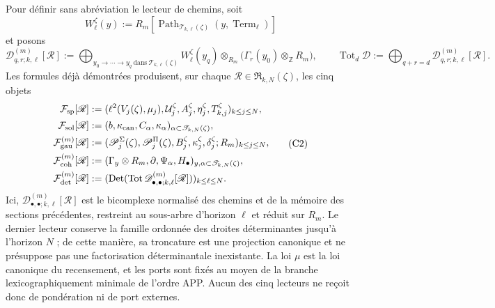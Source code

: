 Pour définir sans abréviation le lecteur de chemins, soit
\[
 W_\ell^\zeta(y):=
 R_m[\operatorname{Path}_{\mathscr T_{k,\ell}(\zeta)}
          (y,\operatorname{Term}_\ell)]
\]
et posons
\[
 \mathscr D_{q,r;k,\ell}^{(m)}[\mathscr R]
 :=\bigoplus_{y_0\to\cdots\to y_q\ \text{dans}\
                  \mathscr T_{k,\ell}(\zeta)}
 W_\ell^\zeta(y_q)\otimes_{R_m}
 \bigl(\Gamma_r(y_0)\otimes_{\mathbb Z}R_m\bigr),
 \qquad
 \operatorname{Tot}_d\mathscr D
 :=\bigoplus_{q+r=d}\mathscr D_{q,r;k,\ell}^{(m)}[\mathscr R].
\]
Les formules déjà démontrées produisent, sur chaque
\(\mathscr R\in\mathfrak R_{k,N}(\zeta)\), les cinq objets
\[
\begin{aligned}
 \mathcal F_{\rm sp}[\mathscr R]
 &:=(\ell^2(V_j(\zeta),\mu_j),
       \mathcal U_j^\zeta,A_j^\zeta,\eta_j^\zeta,
       T_{k,j}^\zeta)_{k\leq j\leq N},\\
 \mathcal F_{\rm sol}[\mathscr R]
 &:=(b,\kappa_{\rm can},C_\alpha,\kappa_\alpha)
      _{\alpha\subset\mathscr T_{k,N}(\zeta)},\\
 \mathcal F_{\rm gau}^{(m)}[\mathscr R]
 &:=(\mathscr P_j^\Sigma(\zeta),\mathscr P_j^\Pi(\zeta),
       B_j^\zeta,\kappa_j^\zeta,\delta_j^\zeta;R_m)_{k\leq j\leq N},\\
 \mathcal F_{\rm coh}^{(m)}[\mathscr R]
 &:=(\Gamma_y\otimes R_m,\partial,\Psi_\alpha,H_\bullet)
      _{y,\alpha\subset\mathscr T_{k,N}(\zeta)},\\
 \mathcal F_{\rm det}^{(m)}[\mathscr R]
 &:=(\operatorname{Det}(\operatorname{Tot}
       \mathscr D_{\bullet,\bullet;k,\ell}^{(m)}[\mathscr R]))
       _{k\leq\ell\leq N}.
\end{aligned}
\tag{C2}
\label{ix:eq:cinco-lectores-comunes}
\]
Ici, \(\mathscr D_{\bullet,\bullet;k,\ell}^{(m)}[\mathscr R]\) est le
bicomplexe normalisé
des chemins et de la mémoire des sections précédentes, restreint au sous-arbre
d'horizon \(\ell\) et réduit sur \(R_m\). Le dernier lecteur conserve la
famille ordonnée des droites déterminantes jusqu'à l'horizon \(N\) ; de cette
manière, sa troncature est une projection canonique et ne présuppose pas une
factorisation déterminantale inexistante. La loi \(\mu\) est la loi canonique
du recensement, et les ports sont fixés au moyen de la branche lexicographiquement minimale
de l'ordre APP. Aucun des cinq lecteurs ne reçoit donc de pondération
ni de port externes.

